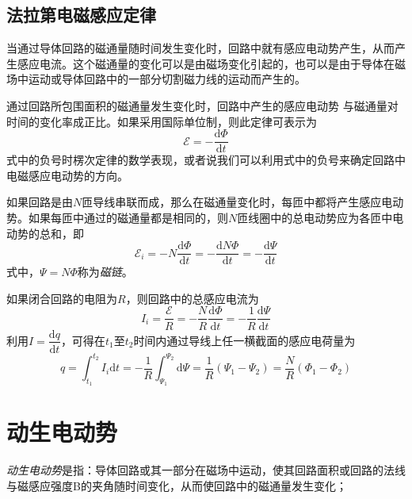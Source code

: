 \documentclass[
	12pt, %
	a4paper, %
]{myLegrandOrangeBook}
\newcommand{\rmd}{\mathrm{d}}
\newcommand{\deriv}[2]{\frac{\rmd #1}{\rmd #2}}
\newcommand{\dderiv}[2]{\dfrac{\rmd #1}{\rmd #2}}
\begin{document}
\subsection{法拉第电磁感应定律}

当通过导体回路的磁通量随时间发生变化时，回路中就有感应电动势产生，从而产生感应电流。这个磁通量的变化可以是由磁场变化引起的，也可以是由于导体在磁场中运动或导体回路中的一部分切割磁力线的运动而产生的。

\begin{theorem}[法拉第电磁感应定律]
通过回路所包围面积的磁通量发生变化时，回路中产生的感应电动势 与磁通量对时间的变化率成正比。如果采用国际单位制，则此定律可表示为
\begin{equation}
    \mathscr{E} = - \deriv{\Phi}{t}
\end{equation}
式中的负号时楞次定律的数学表现，或者说我们可以利用式中的负号来确定回路中电磁感应电动势的方向。
\end{theorem}

如果回路是由\(N\)匝导线串联而成，那么在磁通量变化时，每匝中都将产生感应电动势。如果每匝中通过的磁通量都是相同的，则\(N\)匝线圈中的总电动势应为各匝中电动势的总和，即
\begin{equation}
    \mathscr{E}_i = - N \deriv{\varPhi}{t} = -\deriv{N \varPhi}{t} = -\deriv{\varPsi}{t}
\end{equation}
式中，\(\varPsi = N \varPhi\)称为\emph{磁链}。

如果闭合回路的电阻为\(R\)，则回路中的总感应电流为
\begin{equation}
    I_i = \frac{\mathscr{E}}{R} = -\frac{N}{R} \deriv{\varPhi}{t} = -\frac{1}{R} \deriv{\varPsi}{t}
\end{equation}
利用\(I = \dderiv{q}{t}\)，可得在\(t_1\)至\(t_2\)时间内通过导线上任一横截面的感应电荷量为
\begin{equation}
    q = \int_{t_1}^{t_2} I_i \rmd t = -\frac{1}{R} \int_{\varPsi_1}^{\varPsi_2} \rmd \varPsi = \frac{1}{R} \left(\varPsi_1 - \varPsi_2\right)= \frac{N}{R} \left(\varPhi_1 - \varPhi_2\right)
\end{equation}

\section{动生电动势}

\begin{definition}[动生电动势]
\emph{动生电动势}是指：导体回路或其一部分在磁场中运动，使其回路面积或回路的法线与磁感应强度B的夹角随时间变化，从而使回路中的磁通量发生变化；
\end{definition}
\end{document}
